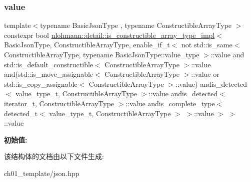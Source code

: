 \subsubsection{\texorpdfstring{value}{value}}
{\footnotesize\ttfamily template$<$typename Basic\+Json\+Type , typename Constructible\+Array\+Type $>$ \\
constexpr bool \mbox{\hyperlink{structnlohmann_1_1detail_1_1is__constructible__array__type__impl}{nlohmann\+::detail\+::is\+\_\+constructible\+\_\+array\+\_\+type\+\_\+impl}}$<$ Basic\+Json\+Type, Constructible\+Array\+Type, enable\+\_\+if\+\_\+t$<$ not std\+::is\+\_\+same$<$ Constructible\+Array\+Type, typename Basic\+Json\+Type\+::value\+\_\+type $>$\+::value and std\+::is\+\_\+default\+\_\+constructible$<$ Constructible\+Array\+Type $>$\+::value and(std\+::is\+\_\+move\+\_\+assignable$<$ Constructible\+Array\+Type $>$\+::value or std\+::is\+\_\+copy\+\_\+assignable$<$ Constructible\+Array\+Type $>$\+::value) andis\+\_\+detected$<$ value\+\_\+type\+\_\+t, Constructible\+Array\+Type $>$\+::value andis\+\_\+detected$<$ iterator\+\_\+t, Constructible\+Array\+Type $>$\+::value andis\+\_\+complete\+\_\+type$<$ detected\+\_\+t$<$ value\+\_\+type\+\_\+t, Constructible\+Array\+Type $>$ $>$\+::value $>$ $>$\+::value\hspace{0.3cm}{\ttfamily [static]}}

{\bfseries 初始值\+:}
\begin{DoxyCode}{0}
\DoxyCodeLine{=}
\DoxyCodeLine{        }
\DoxyCodeLine{        }
\DoxyCodeLine{        }
\DoxyCodeLine{        }
\DoxyCodeLine{        }
\DoxyCodeLine{}

\end{DoxyCode}


该结构体的文档由以下文件生成\+:\begin{DoxyCompactItemize}
\item 
ch01\+\_\+template/json.\+hpp\end{DoxyCompactItemize}
